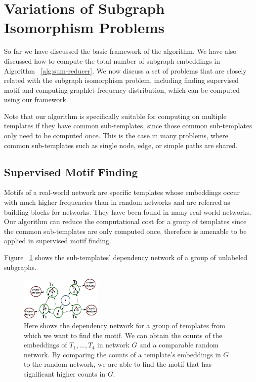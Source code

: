 \section{Variations of Subgraph Isomorphism Problems}
\label{sec:apps}

So far we have discussed the basic framework of the algorithm. We have also
discussed how to compute the total number of subgraph embeddings in Algorithm
~\ref{alg:sum-reducer}. We now discuss a set of
problems that are closely related with the subgraph isomorphism problem,
including finding supervised motif and computing graphlet frequency
distribution, which can be computed using our framework.

Note that our algorithm is specifically suitable for computing on multiple
templates if they have common sub-templates, since those common sub-templates
only need to be computed once. This is the case in many problems, where
common sub-templates such as single node, edge, or simple paths are shared.

\subsection{Supervised Motif Finding}

Motifs of a real-world network are specific templates whose embeddings
occur with much higher frequencies than in random networks and are referred
as building blocks for networks. They have been found in many real-world
networks\cite{milo2002network}. Our algorithm can reduce the computational
cost for a group of templates since the common sub-templates are only computed
once, therefore is amenable to be applied in supervised motif finding. 

\iffalse
Figure
~\ref{fig:unlabel-gtree} shows the sub-templates' dependency network of a group
of unlabeled subgraphs. 

\begin{figure}[htbp]

\centerline{\includegraphics[width=0.35\textwidth]{plots/unlabeledGTree.eps}}

\caption{Here shows the dependency network for a group of templates from which
we want to find the motif. We can obtain the counts of the embeddings of
$T_1,\ldots,T_4$ in network $G$ and a comparable random network. By comparing
the counts of a template's embeddings in $G$ to the random network, we are able
to find the motif that has significant higher counts in $G$.}

\label{fig:unlabel-gtree}
\end{figure}

